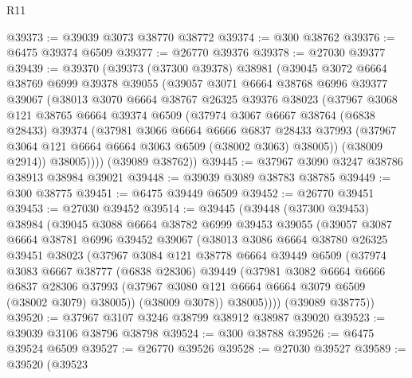\begin{lexlean}{R11}
\begin{coremodule}
@39373 := @39039 @3073 @38770 @38772
@39374 := @300 @38762
@39376 := @6475 @39374 @6509
@39377 := @26770 @39376
@39378 := @27030 @39377
@39439 := @39370
    (@39373
      (@37300 @39378)
      @38981
      (@39045
        @3072
        @6664
        @38769
        @6999
        @39378
        @39055
        (@39057
          @3071
          @6664
          @38768
          @6996
          @39377
          @39067
          (@38013
            @3070
            @6664
            @38767
            @26325
            @39376
            @38023
            (@37967
              @3068
              @121
              @38765
              @6664
              @39374
              @6509
              (@37974
                @3067
                @6667
                @38764
                (@6838 @28433)
                @39374
                (@37981
                  @3066
                  @6664
                  @6666
                  @6837
                  @28433
                  @37993
                  (@37967 @3064 @121 @6664 @6664 @3063 @6509 (@38002 @3063) @38005))
                (@38009 @2914))
              @38005))))
      (@39089 @38762))
@39445 := @37967 @3090 @3247 @38786 @38913 @38984 @39021
@39448 := @39039 @3089 @38783 @38785
@39449 := @300 @38775
@39451 := @6475 @39449 @6509
@39452 := @26770 @39451
@39453 := @27030 @39452
@39514 := @39445
    (@39448
      (@37300 @39453)
      @38984
      (@39045
        @3088
        @6664
        @38782
        @6999
        @39453
        @39055
        (@39057
          @3087
          @6664
          @38781
          @6996
          @39452
          @39067
          (@38013
            @3086
            @6664
            @38780
            @26325
            @39451
            @38023
            (@37967
              @3084
              @121
              @38778
              @6664
              @39449
              @6509
              (@37974
                @3083
                @6667
                @38777
                (@6838 @28306)
                @39449
                (@37981
                  @3082
                  @6664
                  @6666
                  @6837
                  @28306
                  @37993
                  (@37967 @3080 @121 @6664 @6664 @3079 @6509 (@38002 @3079) @38005))
                (@38009 @3078))
              @38005))))
      (@39089 @38775))
@39520 := @37967 @3107 @3246 @38799 @38912 @38987 @39020
@39523 := @39039 @3106 @38796 @38798
@39524 := @300 @38788
@39526 := @6475 @39524 @6509
@39527 := @26770 @39526
@39528 := @27030 @39527
@39589 := @39520
    (@39523

\end{coremodule}
\end{lexlean}
